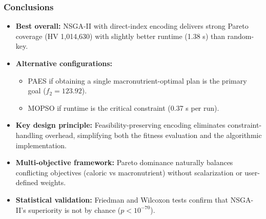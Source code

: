 \documentclass[aspectratio=169,10pt]{beamer}
\begin{document}
\begin{frame}
\frametitle{Conclusions}

\begin{itemize}
  \item \textbf{Best overall:} NSGA-II with direct-index encoding delivers strong Pareto coverage (HV 1,014,630) with slightly better runtime (1.38 s) than random-key.

  \vspace{0.25cm}

  \item \textbf{Alternative configurations:}
  \begin{itemize}
    \item PAES if obtaining a single macronutrient-optimal plan is the primary goal ($f_2 = 123.92$).
    \item MOPSO if runtime is the critical constraint (0.37 s per run).
  \end{itemize}

  \vspace{0.25cm}

  \item \textbf{Key design principle:} Feasibility-preserving encoding eliminates constraint-handling overhead, simplifying both the fitness evaluation and the algorithmic implementation.

  \vspace{0.25cm}

  \item \textbf{Multi-objective framework:} Pareto dominance naturally balances conflicting objectives (caloric vs macronutrient) without scalarization or user-defined weights.

  \vspace{0.25cm}

  \item \textbf{Statistical validation:} Friedman and Wilcoxon tests confirm that NSGA-II's superiority is not by chance ($p < 10^{-70}$).
\end{itemize}

\end{frame}
\end{document}
